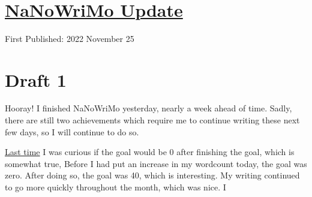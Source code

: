 \documentclass[12pt]{article}[titlepage]
\newcommand{\1}{\={a}}
\newcommand{\2}{\={e}}
\newcommand{\3}{\={\i}}
\newcommand{\4}{\=o}
\newcommand{\5}{\=u}
\newcommand{\6}{\={A}}
\renewcommand{\,}{\textsuperscript{,}}
\begin{document}

\doublespacing
\section{\href{nanowrimo-4.html}{NaNoWriMo Update}}
First Published: 2022 November 25
\section{Draft 1}
Hooray! I finished NaNoWriMo yesterday, nearly a week ahead of time.
Sadly, there are still two achievements which require me to continue writing these next few days, so I will continue to do so.

\href{nanowrimo-3.hmtl}{Last time} I was curious if the goal would be 0 after finishing the goal, which is somewhat true,
Before I had put an increase in my wordcount today, the goal was zero.
After doing so, the goal was 40, which is interesting.
My writing continued to go more quickly throughout the month, which was nice.
I
\end{document}
